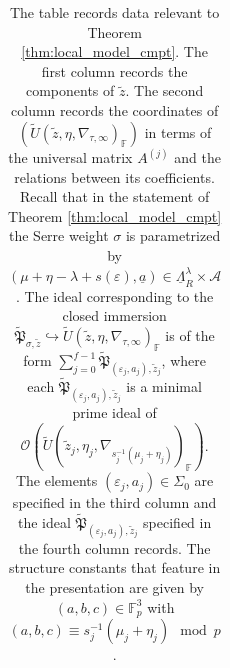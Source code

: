\documentclass[oneside,a4paper,english, 11pt]{amsart}
\theoremstyle{plain}
\theoremstyle{plain}
\theoremstyle{plain}
\theoremstyle{plain}
\theoremstyle{plain}
\theoremstyle{plain}
\theoremstyle{definition}
\theoremstyle{definition}
\theoremstyle{definition}
\theoremstyle{remark}
\numberwithin{equation}{section}
\newcommand{\F}{\mathbb{F}}
\newcommand{\fP}{\mathfrak{P}}
\newcommand{\cA}{\mathcal{A}}
\newcommand{\cO}{\mathcal{O}}
\newcommand{\eps}{\varepsilon}
\newcommand{\La}{\Lambda}
\newcommand{\Fp}{\F_p}
\newcommand{\un}[1]{\underline{#1}}
\newcommand{\tld}[1]{\widetilde{#1}}
\newcommand{\into}{\hookrightarrow}
\begin{document}
\begin{table}[H]
{\begin{tabular}{| c | c | c | c |}
&&&\\
\hline
\end{tabular}}
\caption*{The table records data relevant to Theorem \ref{thm:local_model_cmpt}. %
The first column records the components of $\tld{z}$. 
The second column records the coordinates of $(\tld{U}(\tld{z}, \eta,\nabla_{\tau,\infty})_{\F})$ in terms of the universal matrix $A^{(j)}$ and the relations between its coefficients.
Recall that in the statement of Theorem \ref{thm:local_model_cmpt} the Serre weight $\sigma$ is parametrized by $(\mu+\eta-\lambda+s(\eps),\un{a})\in \un{\La}_R^{\lambda}\times\cA$.
The ideal corresponding to the closed immersion  $\tld{\fP}_{\sigma,\tld{z}}\into \tld{U}(\tld{z},\eta,\nabla_{\tau,\infty})_{\F}$ is of the form $\sum_{j=0}^{f-1}\tld{\fP}_{(\eps_j,a_j),\tld{z}_j}$, where each $\tld{\fP}_{(\eps_j,a_j),\tld{z}_j}$ is a minimal prime ideal of $\cO(\tld{U}(\tld{z}_j, \eta_j,\nabla_{s_j^{-1}(\mu_j+\eta_j)})_{\F})$.
The elements $(\eps_j,a_j)\in \Sigma_0$ are specified in the third column and the ideal $\tld{\fP}_{(\eps_j,a_j),\tld{z}_j}$ specified in the fourth column records.
%
The structure constants that feature in the presentation are given by $(a,b,c)\in\Fp^3$ with $(a,b,c)\equiv s_j^{-1}(\mu_j+\eta_j)\mod p$.
}
\end{table}
\end{document}
